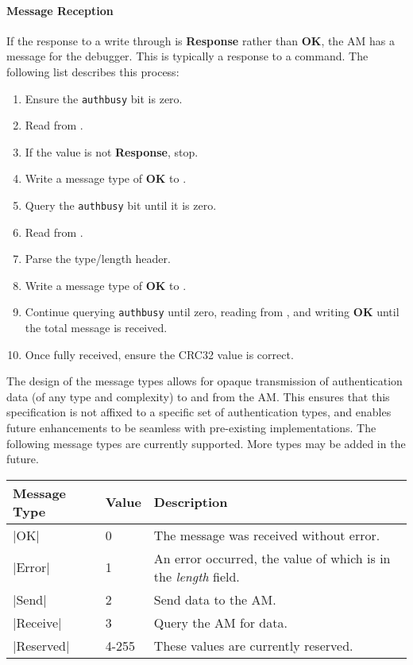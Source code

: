 \paragraph{Message Reception}
If the response to a write through \Rauthdata is {\bf Response} rather than {\bf OK}, the AM has a message for the debugger. This is typically a response to a command. The following list describes this process:
\begin{enumerate}
    \item Ensure the {\tt authbusy} bit is zero.
    \item Read from \Rauthdata.
    \item If the value is not {\bf Response}, stop.
    \item Write a message type of {\bf OK} to \Rauthdata.
    \item Query the {\tt authbusy} bit until it is zero.
    \item Read from \Rauthdata.
    \item Parse the type/length header.
    \item Write a message type of {\bf OK} to \Rauthdata.
    \item Continue querying {\tt authbusy} until zero, reading from \Rauthdata, and writing {\bf OK} until the total message is received.
    \item Once fully received, ensure the CRC32 value is correct.
\end{enumerate}

The design of the message types allows for opaque transmission of authentication data (of any type and complexity) to and from the AM. This ensures that this specification is not affixed to a specific set of authentication types, and enables future enhancements to be seamless with pre-existing implementations. The following message types are currently supported. More types may be added in the future. 
\begin{center}
	\begin{tabular}{ |l|l|l| }
	\hline
    Message Type & Value & Description \\
	\hline
	|OK| & 0 & The message was received without error.\\
    |Error| & 1 & An error occurred, the value of which is in the {\em length} field.\\
    |Send| & 2 & Send data to the AM.\\
    |Receive| & 3 & Query the AM for data.\\
    |Reserved| & 4-255 & These values are currently reserved.\\
	\hline
	\end{tabular}
\end{center}

